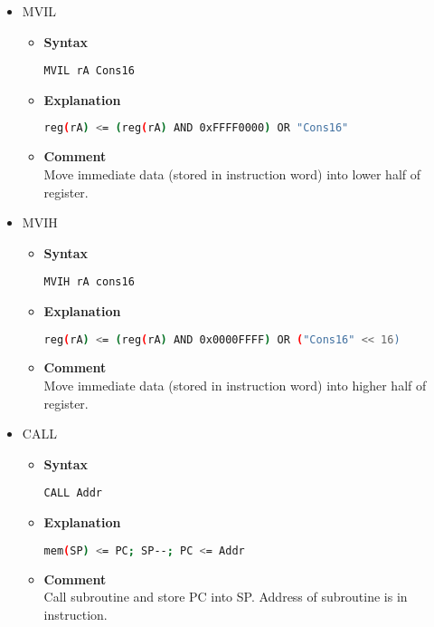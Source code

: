 \begin{itemize}
    \item MVIL
    \begin{itemize}
        \item \textbf{Syntax}
        \begin{lstlisting}[language={[markII]Assembler}, frame=single]
    MVIL rA Cons16
        \end{lstlisting}
        \item \textbf{Explanation}
        \begin{lstlisting}[language=bash, frame=single]
    reg(rA) <= (reg(rA) AND 0xFFFF0000) OR "Cons16"
        \end{lstlisting}
        \item \textbf{Comment} \\
    Move immediate data (stored in instruction word) into lower half of register.
    \end{itemize}

    \item MVIH
    \begin{itemize}
        \item \textbf{Syntax}
        \begin{lstlisting}[language={[markII]Assembler}, frame=single]
    MVIH rA cons16
        \end{lstlisting}
        \item \textbf{Explanation}
        \begin{lstlisting}[language=bash, frame=single]
    reg(rA) <= (reg(rA) AND 0x0000FFFF) OR ("Cons16" << 16)
        \end{lstlisting}
        \item \textbf{Comment} \\
    Move immediate data (stored in instruction word) into higher half of register.
    \end{itemize}

    \item CALL
    \begin{itemize}
        \item \textbf{Syntax}
        \begin{lstlisting}[language={[markII]Assembler}, frame=single]
    CALL Addr
        \end{lstlisting}
        \item \textbf{Explanation}
        \begin{lstlisting}[language=bash, frame=single]
    mem(SP) <= PC; SP--; PC <= Addr
        \end{lstlisting}
        \item \textbf{Comment} \\
    Call subroutine and store PC into SP. Address of subroutine is in instruction.
    \end{itemize}


\end{itemize}
